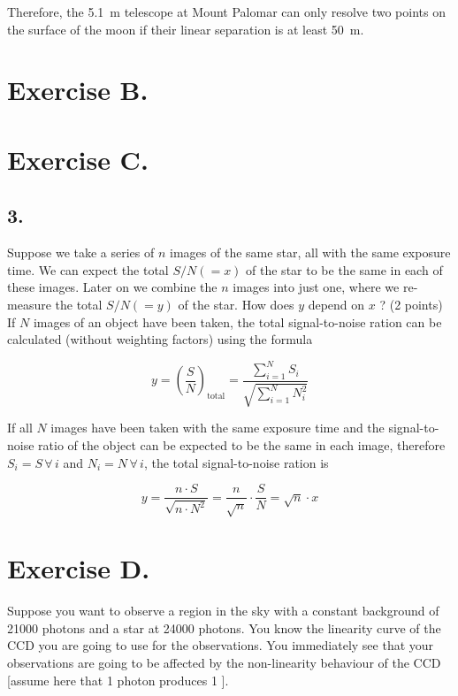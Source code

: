 \documentclass[11pt,a4paper,twoside]{article}
\newcommand{\electron}{\ce{e^-}}
\begin{document}
Therefore, the \SI{5.1}{\meter} telescope at Mount Palomar can only resolve two points on the surface of the moon if their linear separation is at least \SI{50}{\meter}.

\section*{Exercise B.} 

\section*{Exercise C.}

\subsection*{3.}  Suppose we take a series of $n$ images of the same star, all with the same exposure time. We can expect the total $S/N (= x)$ of the star to be the same in each of these images. Later on we combine the $n$ images into just one, where we re-measure the total $S/N (= y)$ of the star. How does $y$ depend on $x$ ? (2 points) \\

If $N$ images of an object have been taken, the total signal-to-noise ration can be calculated (without weighting factors) using the formula

\begin{equation}
 y = \left( \frac{S}{N} \right)_{\text{total}} = \frac{\sum_{i=1}^N S_i}{\sqrt{\sum_{i=1}^N N_i^2}}
\end{equation}

If all $N$ images have been taken with the same exposure time and the signal-to-noise ratio of the object can be expected to be the same in each image, therefore $S_i = S \, \forall \, i$ and $N_i = N \, \forall \, i$, the total signal-to-noise ration is 

\begin{equation}
 y = \frac{n \cdot S}{\sqrt{n \cdot N^2}} = \frac{n}{\sqrt{n}} \cdot \frac{S}{N} = \sqrt{n} \cdot x
\end{equation}

\section*{Exercise D.}

Suppose you want to observe a region in the sky with a constant background of \num{21000} photons and a star at \num{24000} photons. You know the linearity curve of the CCD you are going to use for the observations. You immediately see that your observations are going to be affected by the non-linearity behaviour of the CCD [assume here that \num{1} photon produces \num{1} \electron].
\end{document}
